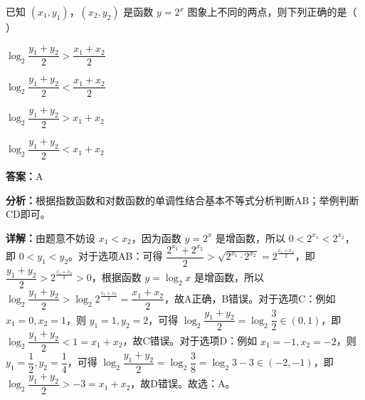 \begin{question}[points=4]
已知 $(x_1,y_1)$，$(x_2,y_2)$ 是函数 $y=2^x$ 图象上不同的两点，则下列正确的是（ ）
\begin{choices}
  \item $\log_2 \dfrac{y_1+y_2}{2} > \dfrac{x_1+x_2}{2}$
  \item $\log_2 \dfrac{y_1+y_2}{2} < \dfrac{x_1+x_2}{2}$
  \item $\log_2 \dfrac{y_1+y_2}{2} > x_1+x_2$
  \item $\log_2 \dfrac{y_1+y_2}{2} < x_1+x_2$
\end{choices}
\begin{solution}
\textbf{答案：}A

\textbf{分析：}根据指数函数和对数函数的单调性结合基本不等式分析判断AB；举例判断CD即可。

\textbf{详解：}由题意不妨设 $x_1<x_2$，因为函数 $y=2^x$ 是增函数，所以 $0<2^{x_1}<2^{x_2}$，即 $0<y_1<y_2$。对于选项AB：可得 $\dfrac{2^{x_1}+2^{x_2}}{2} > \sqrt{2^{x_1}\cdot2^{x_2}} = 2^{\frac{x_1+x_2}{2}}$，即 $\dfrac{y_1+y_2}{2} > 2^{\frac{x_1+x_2}{2}} > 0$，根据函数 $y=\log_2 x$ 是增函数，所以 $\log_2 \dfrac{y_1+y_2}{2} > \log_2 2^{\frac{x_1+x_2}{2}} = \dfrac{x_1+x_2}{2}$，故A正确，B错误。对于选项C：例如 $x_1=0, x_2=1$，则 $y_1=1, y_2=2$，可得 $\log_2 \dfrac{y_1+y_2}{2} = \log_2 \dfrac{3}{2} \in (0,1)$，即 $\log_2 \dfrac{y_1+y_2}{2} < 1 = x_1+x_2$，故C错误。对于选项D：例如 $x_1=-1, x_2=-2$，则 $y_1=\dfrac{1}{2}, y_2=\dfrac{1}{4}$，可得 $\log_2 \dfrac{y_1+y_2}{2} = \log_2 \dfrac{3}{8} = \log_2 3 - 3 \in (-2,-1)$，即 $\log_2 \dfrac{y_1+y_2}{2} > -3 = x_1+x_2$，故D错误。故选：A。
\end{solution}
\end{question}

